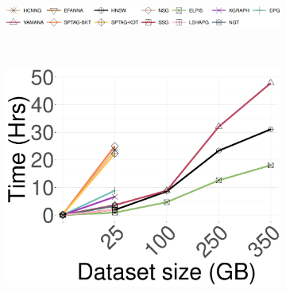 \begin{figure}[!htb]
	\captionsetup{justification=centering}
	\centering	
	\begin{minipage}{\textwidth}
		\begin{subfigure}{\textwidth}
			\centering
			\captionsetup{justification=centering}				\includegraphics[width=\textwidth]{../img/Experiments/legendall.png}
		\end{subfigure}\\
		\vspace{-0.3cm}
	\end{minipage}
	\begin{minipage}{0.28\textwidth}				
			\centering
		\begin{subfigure}{\textwidth}
			\captionsetup{justification=centering}	
			\includegraphics[width=\textwidth]{../img/Experiments/Idx_footprint_datasets/idx_time_deep_n.pdf}
		\end{subfigure}	
		\caption{{Indexing Time}}
		\label{fig:elpis:idx:time}
	\end{minipage}	
 \hspace{0.15in}
	\begin{minipage}{0.28\textwidth}				
		\begin{subfigure}{\textwidth}
			\centering
			\captionsetup{justification=centering}	

\end{subfigure}
\end{minipage}
\end{figure}
